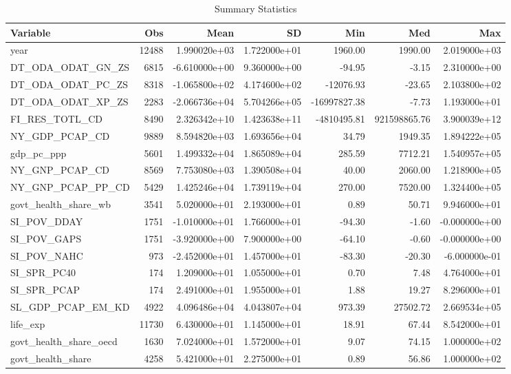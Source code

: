 \begin{table}
\centering
\caption{Summary Statistics}
\label{Sum_Stats}
\begin{tabular}{lrrrrrr}
\toprule
              Variable &   Obs &          Mean &           SD &          Min &          Med &           Max \\
\midrule
year & 12488 & 1.990020e+03 & 1.722000e+01 & 1960.00 & 1990.00 & 2.019000e+03 \\
DT\_ODA\_ODAT\_GN\_ZS & 6815 & -6.610000e+00 & 9.360000e+00 & -94.95 & -3.15 & 2.310000e+00 \\
DT\_ODA\_ODAT\_PC\_ZS & 8318 & -1.065800e+02 & 4.174600e+02 & -12076.93 & -23.65 & 2.103800e+02 \\
DT\_ODA\_ODAT\_XP\_ZS & 2283 & -2.066736e+04 & 5.704266e+05 & -16997827.38 & -7.73 & 1.193000e+01 \\
FI\_RES\_TOTL\_CD & 8490 & 2.326342e+10 & 1.423638e+11 & -4810495.81 & 921598865.76 & 3.900039e+12 \\
NY\_GDP\_PCAP\_CD & 9889 & 8.594820e+03 & 1.693656e+04 & 34.79 & 1949.35 & 1.894222e+05 \\
gdp\_pc\_ppp & 5601 & 1.499332e+04 & 1.865089e+04 & 285.59 & 7712.21 & 1.540957e+05 \\
NY\_GNP\_PCAP\_CD & 8569 & 7.753080e+03 & 1.390508e+04 & 40.00 & 2060.00 & 1.218900e+05 \\
NY\_GNP\_PCAP\_PP\_CD & 5429 & 1.425246e+04 & 1.739119e+04 & 270.00 & 7520.00 & 1.324400e+05 \\
govt\_health\_share\_wb & 3541 & 5.020000e+01 & 2.193000e+01 & 0.89 & 50.71 & 9.946000e+01 \\
SI\_POV\_DDAY & 1751 & -1.010000e+01 & 1.766000e+01 & -94.30 & -1.60 & -0.000000e+00 \\
SI\_POV\_GAPS & 1751 & -3.920000e+00 & 7.900000e+00 & -64.10 & -0.60 & -0.000000e+00 \\
SI\_POV\_NAHC & 973 & -2.452000e+01 & 1.457000e+01 & -83.30 & -20.30 & -6.000000e-01 \\
SI\_SPR\_PC40 & 174 & 1.209000e+01 & 1.055000e+01 & 0.70 & 7.48 & 4.764000e+01 \\
SI\_SPR\_PCAP & 174 & 2.491000e+01 & 1.955000e+01 & 1.88 & 19.27 & 8.296000e+01 \\
SL\_GDP\_PCAP\_EM\_KD & 4922 & 4.096486e+04 & 4.043807e+04 & 973.39 & 27502.72 & 2.669534e+05 \\
life\_exp & 11730 & 6.430000e+01 & 1.145000e+01 & 18.91 & 67.44 & 8.542000e+01 \\
govt\_health\_share\_oecd & 1630 & 7.024000e+01 & 1.572000e+01 & 9.07 & 74.15 & 1.000000e+02 \\
govt\_health\_share & 4258 & 5.421000e+01 & 2.275000e+01 & 0.89 & 56.86 & 1.000000e+02 \\
\bottomrule
\end{tabular}
\end{table}
